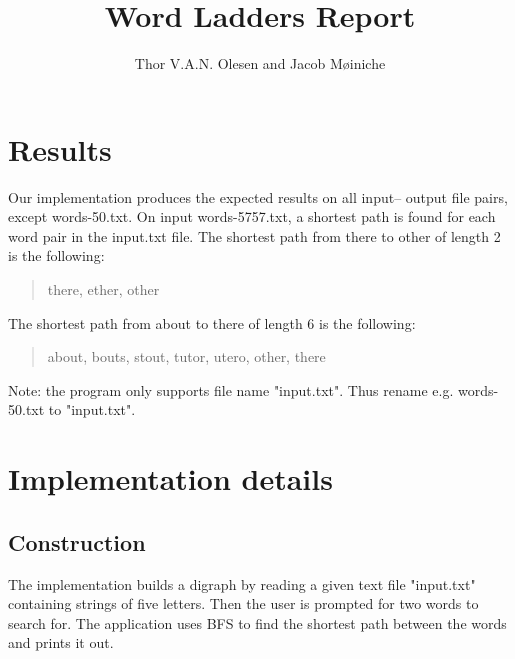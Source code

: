 \documentclass{tufte-handout}
\title{Word Ladders Report}
\author{Thor V.A.N. Olesen and Jacob Møiniche}
\begin{document}
\maketitle

\section{Results}

Our implementation produces the expected results on all input– output file pairs, except words-50.txt. On input words-5757.txt, a shortest path is found for each word pair in the input.txt file. The shortest path from there to other of length 2 is the following:
  \begin{quotation}
there, ether, other	
  \end{quotation}

The shortest path from about to there of length 6 is the following: 
  \begin{quotation}
about, bouts, stout, tutor, utero, other, there
  \end{quotation}

Note: the program only supports file name "input.txt". Thus rename e.g. words-50.txt to "input.txt". 

  \section{Implementation details}

\subsection{Construction}
The implementation builds a digraph by reading a given text file "input.txt" containing strings of five letters. Then the user is prompted for two words to search for. The application uses BFS to find the shortest path between the words and prints it out.
\end{document}
